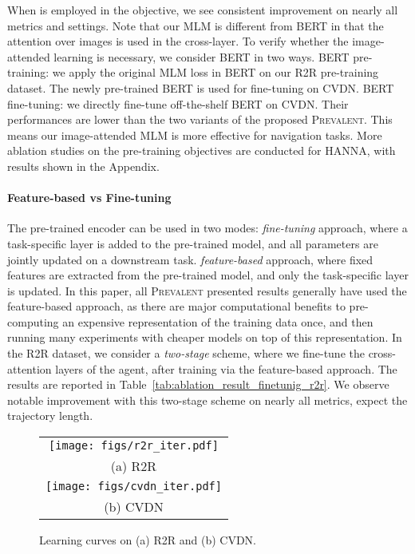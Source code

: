 \documentclass[10pt,twocolumn,letterpaper]{article}
\newcommand{\short}{\textsc{Prevalent}}
\begin{document}
When  is employed in the objective, we see consistent improvement on nearly all metrics and settings. 
Note that our MLM is different from BERT in that the attention over images is used in the cross-layer. To verify whether the image-attended learning is necessary, we consider BERT in two ways. 
 BERT pre-training: we apply the original MLM loss in BERT on our R2R pre-training dataset. The newly pre-trained BERT is used for fine-tuning on CVDN. 
 BERT fine-tuning: we directly fine-tune off-the-shelf BERT on CVDN.  
Their performances are lower than the two variants of the proposed \short{}. This means our image-attended MLM is more effective for navigation tasks. More ablation studies on the pre-training objectives are conducted for HANNA, with results shown in the Appendix.

\paragraph{Feature-based vs Fine-tuning}

The pre-trained encoder can be used in two modes: 
 {\em fine-tuning} approach, where a task-specific layer is added to the pre-trained model, and all parameters are jointly updated on a downstream task. 
 {\em feature-based} approach, where fixed features are extracted from the pre-trained model, and only the task-specific layer is updated.
In this paper, all \short{} presented results generally have used the feature-based approach, as there are major computational benefits to pre-computing an expensive representation of the training data once, and then running many experiments with cheaper models on top of this representation. In the R2R dataset, we consider a {\em two-stage} scheme, where we fine-tune the cross-attention layers of the agent, after training via the feature-based approach. The results are reported in Table~\ref{tab:ablation_result_finetunig_r2r}. We observe notable improvement with this two-stage scheme on nearly all metrics, expect the trajectory length. 


\begin{figure}[t!]\vspace{-0mm}\centering
	\begin{tabular}{c}
		\hspace{-4mm}
		\texttt{[image: figs/r2r\_iter.pdf]} 
		\vspace{-2mm}\\
		(a) R2R  \\
		\hspace{-2mm}
		\texttt{[image: figs/cvdn\_iter.pdf]} 
		\vspace{-2mm} \\
		(b) CVDN 
		 \vspace{-2mm}
	\end{tabular}
\caption{Learning curves on (a) R2R and (b) CVDN.}
	\vspace{-0mm}
	\label{fig:lc_comparison}
\end{figure}
\end{document}
